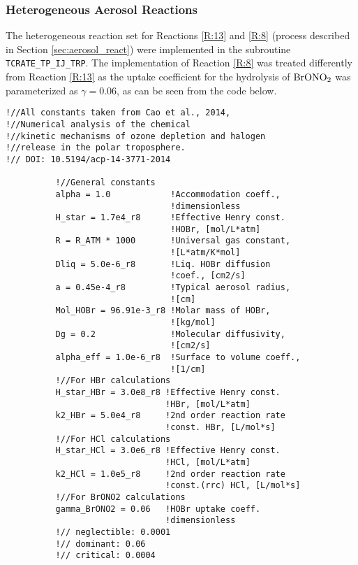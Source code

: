 \subsubsection{Heterogeneous Aerosol Reactions}\label{sec:het_aerosol_react_CTM3}

The heterogeneous reaction set for Reactions \ref{R:13} and \ref{R:8} (process described in Section \ref{sec:aerosol_react}) were implemented in the subroutine \texttt{TCRATE\_TP\_IJ\_TRP}. The implementation of Reaction \ref{R:8} was treated differently from Reaction \ref{R:13} as the uptake coefficient for the hydrolysis of $\mathrm{BrONO_2}$ was parameterized as $\gamma = 0.06$, as can be seen from the code below. 


\begin{lstlisting}
!//All constants taken from Cao et al., 2014, 
!//Numerical analysis of the chemical
!//kinetic mechanisms of ozone depletion and halogen 
!//release in the polar troposphere.
!// DOI: 10.5194/acp-14-3771-2014

          !//General constants
          alpha = 1.0            !Accommodation coeff., 
                                 !dimensionless
          H_star = 1.7e4_r8      !Effective Henry const. 
                                 !HOBr, [mol/L*atm]
          R = R_ATM * 1000       !Universal gas constant, 
                                 ![L*atm/K*mol] 
          Dliq = 5.0e-6_r8       !Liq. HOBr diffusion 
                                 !coef., [cm2/s]
          a = 0.45e-4_r8         !Typical aerosol radius, 
                                 ![cm]
          Mol_HOBr = 96.91e-3_r8 !Molar mass of HOBr, 
                                 ![kg/mol]
          Dg = 0.2               !Molecular diffusivity, 
                                 ![cm2/s]
          alpha_eff = 1.0e-6_r8  !Surface to volume coeff., 
                                 ![1/cm]
          !//For HBr calculations
          H_star_HBr = 3.0e8_r8 !Effective Henry const.  
                                !HBr, [mol/L*atm]
          k2_HBr = 5.0e4_r8     !2nd order reaction rate 
                                !const. HBr, [L/mol*s]
          !//For HCl calculations
          H_star_HCl = 3.0e6_r8 !Effective Henry const. 
                                !HCl, [mol/L*atm]
          k2_HCl = 1.0e5_r8     !2nd order reaction rate 
                                !const.(rrc) HCl, [L/mol*s]
          !//For BrONO2 calculations
          gamma_BrONO2 = 0.06   !HOBr uptake coeff. 
                                !dimensionless
          !// neglectible: 0.0001 
          !// dominant: 0.06
          !// critical: 0.0004
          

\end{lstlisting}
